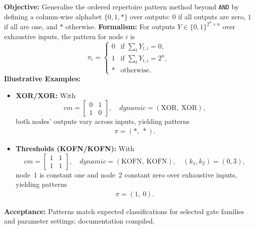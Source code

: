 \textbf{Objective:} Generalise the ordered repertoire pattern method beyond \texttt{AND} by defining a column-wise alphabet \(\{0,1,*\}\) over outputs: \(0\) if all outputs are zero, \(1\) if all are one, and \(*\) otherwise.
\textbf{Formalism:} For outputs \(Y \in \{0,1\}^{2^n \times n}\) over exhaustive inputs, the pattern for node \(i\) is
\[
\pi_i = \begin{cases}
0 & \text{if } \sum_{t} Y_{t,i} = 0,\\
1 & \text{if } \sum_{t} Y_{t,i} = 2^n,\\
* & \text{otherwise.}
\end{cases}
\]
\textbf{Illustrative Examples:}
\begin{itemize}
\item \textbf{XOR/XOR:} With
\[
cm = \begin{bmatrix}0 & 1\\ 1 & 0\end{bmatrix},\quad dynamic=(\text{XOR},\ \text{XOR}),
\]
both nodes’ outputs vary across inputs, yielding patterns
\[
\begin{array}{c}
\pi = (*,\ *).
\end{array}
\]
\item \textbf{Thresholds (KOFN/KOFN):} With
\[
cm = \begin{bmatrix}1 & 1\\ 1 & 1\end{bmatrix},\quad dynamic=(\text{KOFN},\ \text{KOFN}),\quad (k_1, k_2)=(0,3),
\]
node~1 is constant one and node~2 constant zero over exhaustive inputs, yielding patterns
\[
\begin{array}{c}
\pi = (1,\ 0).
\end{array}
\]
\end{itemize}
\textbf{Acceptance:} Patterns match expected classifications for selected gate families and parameter settings; documentation compiled.

